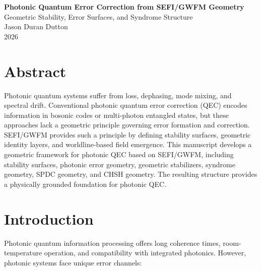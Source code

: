 \documentclass[12pt,twoside]{article}
\begin{document}
\begin{center}
    {\Large \textbf{Photonic Quantum Error Correction from SEFI/GWFM Geometry}}\\

\vspace{0.5cm}
    {\large Geometric Stability, Error Surfaces, and Syndrome Structure}\\

\vspace{0.5cm}
    {\large Jason Duran Dutton}\\

\vspace{0.25cm}
    {\large 2026}
\end{center}

\vspace{1cm}

\section*{Abstract}

Photonic quantum systems suffer from loss, dephasing, mode mixing, and spectral drift.
Conventional photonic quantum error correction (QEC) encodes information in bosonic
codes or multi-photon entangled states, but these approaches lack a geometric principle
governing error formation and correction. SEFI/GWFM provides such a principle by
defining stability surfaces, geometric identity layers, and worldline-based field emergence.
This manuscript develops a geometric framework for photonic QEC based on SEFI/GWFM,
including stability surfaces, photonic error geometry, geometric stabilizers, syndrome
geometry, SPDC geometry, and CHSH geometry. The resulting structure provides a
physically grounded foundation for photonic QEC.

\vspace{0.5cm}

\section{Introduction}

Photonic quantum information processing offers long coherence times, room-temperature
operation, and compatibility with integrated photonics. However, photonic systems face
unique error channels:
\end{document}
